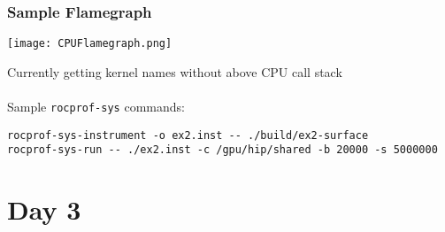 \documentclass{beamer}
\begin{document}

\begin{frame}[fragile]
\begin{center}
\frametitle{Sample Flamegraph}

\texttt{[image: CPUFlamegraph.png]}

Currently getting kernel names without above CPU call stack\\

~\\

Sample \lstinline{rocprof-sys} commands:\\

{\tiny
\begin{lstlisting}[style=boxedC]
rocprof-sys-instrument -o ex2.inst -- ./build/ex2-surface
rocprof-sys-run -- ./ex2.inst -c /gpu/hip/shared -b 20000 -s 5000000
\end{lstlisting}
}

\end{center}
\end{frame}

\section{Day 3}
\end{document}
